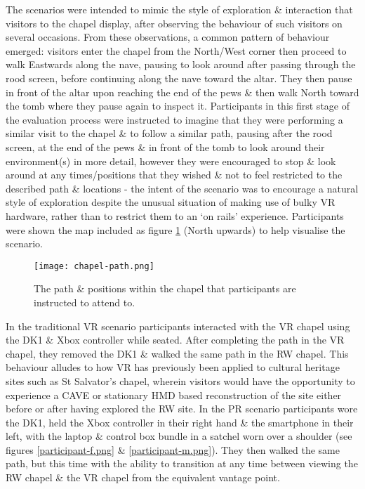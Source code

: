 The scenarios were intended to mimic the style of exploration \& interaction that visitors to the chapel display, after observing the behaviour of such visitors on several occasions. From these observations, a common pattern of behaviour emerged: visitors enter the chapel from the North/West corner then proceed to walk Eastwards along the nave, pausing to look around after passing through the rood screen, before continuing along the nave toward the altar. They then pause in front of the altar upon reaching the end of the pews \& then walk North toward the tomb where they pause again to inspect it. Participants in this first stage of the evaluation process were instructed to imagine that they were performing a similar visit to the chapel \& to follow a similar path, pausing after the rood screen, at the end of the pews \& in front of the tomb to look around their environment(s) in more detail, however they were encouraged to stop \& look around at any times/positions that they wished \& not to feel restricted to the described path \& locations - the intent of the scenario was to encourage a natural style of exploration despite the unusual situation of making use of bulky VR hardware, rather than to restrict them to an `on rails' experience. Participants were shown the map included as figure \ref{chapel-path} (North upwards) to help visualise the scenario.

\begin{figure}[h]
	\begin{center}
		\texttt{[image: chapel-path.png]}
		\caption{The path \& positions within the chapel that participants are instructed to attend to.}
		\label{chapel-path}
	\end{center}
\end{figure}

In the traditional VR scenario participants interacted with the VR chapel using the DK1 \& Xbox controller while seated. After completing the path in the VR chapel, they removed the DK1 \& walked the same path in the RW chapel. This behaviour alludes to how VR has previously been applied to cultural heritage sites such as St Salvator's chapel, wherein visitors would have the opportunity to experience a CAVE or stationary HMD based reconstruction of the site either before or after having explored the RW site. In the PR scenario participants wore the DK1, held the Xbox controller in their right hand \& the smartphone in their left, with the laptop \& control box bundle in a satchel worn over a shoulder (see figures \ref{participant-f.png} \& \ref{participant-m.png}). They then walked the same path, but this time with the ability to transition at any time between viewing the RW chapel \& the VR chapel from the equivalent vantage point.

